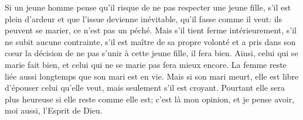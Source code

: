 Si un jeune homme pense qu’il risque de ne pas respecter une jeune fille,
	s’il est plein d’ardeur et que l’issue devienne inévitable,
	qu’il fasse comme il veut:
	ils peuvent se marier, ce n’est pas un péché.
Mais s’il tient ferme intérieurement, s’il ne subit aucune contrainte,
	s’il est maître de sa propre volonté
	et a pris dans son cœur la décision de ne pas s’unir à cette jeune fille,
	il fera bien.
Ainsi, celui qui se marie fait bien, et celui qui ne se marie pas fera mieux encore.
La femme reste liée aussi longtemps que son mari est en vie.
Mais si son mari meurt,
	elle est libre d’épouser celui qu’elle veut, mais seulement s’il est croyant.
Pourtant elle sera plus heureuse si elle reste comme elle est;
	c’est là mon opinion, et je pense avoir, moi aussi, l’Esprit de Dieu.
